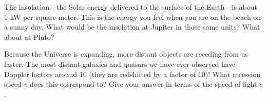\documentclass[12pt, letterpaper]{article}
\begin{document}

\begin{problem}
The insolation---the Solar energy delivered to the surface of the
Earth---is about 1 kW per square meter. This is the energy you feel
when you are on the beach on a sunny day. What would be the insolation
at Jupiter in those same units?  What about at Pluto?
\end{problem}

\begin{problem}
Because the Universe is expanding, more distant objects are receding from us faster.
The most distant galaxies and quasars we have ever observed have Doppler factors
around 10 (they are redshifted by a factor of 10)!
What recession speed $v$ does this correspond to?
Give your answer in terms of the speed of light $c$.
\end{problem}
\end{document}
